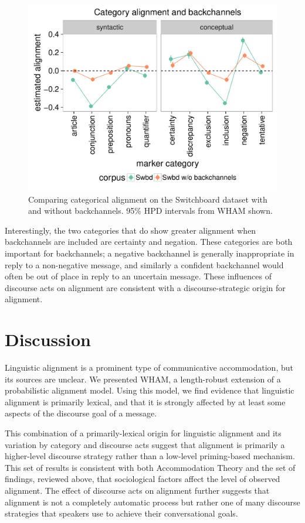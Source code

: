 \documentclass[11pt]{article}
\begin{document}
\begin{figure}[t]
  \begin{center}
    \includegraphics[width=\columnwidth]{results/swbds_line.pdf}\vspace{-10pt}
  \end{center}
  \caption{Comparing categorical alignment on the Switchboard dataset with and without backchannels. 95\% HPD intervals from WHAM shown.}\label{fig:swbds-res}
\end{figure}

Interestingly, the two categories that do show greater alignment when backchannels are included are certainty and negation. These categories are both important for backchannels; a negative backchannel is generally inappropriate in reply to a non-negative message, and similarly a confident backchannel would often be out of place in reply to an uncertain message. These influences of discourse acts on alignment are consistent with a discourse-strategic origin for alignment.

\section{Discussion}
Linguistic alignment is a prominent type of communicative accommodation, but its sources are unclear.  We presented WHAM, a length-robust extension of a probabilistic alignment model. Using this model, we find evidence that linguistic alignment is primarily lexical, and that it is strongly affected by at least some aspects of the discourse goal of a message.

This combination of a primarily-lexical origin for linguistic alignment and its variation by category and discourse acts suggest that alignment is primarily a higher-level discourse strategy rather than a low-level priming-based mechanism.  This set of results is consistent with both Accommodation Theory \cite{GilesCouplandCoupland1991} and the set of findings, reviewed above, that sociological factors affect the level of observed alignment.  The effect of  discourse acts on alignment further suggests that alignment is not a completely automatic process but rather one of many discourse strategies that speakers use to achieve their conversational goals.
\end{document}
